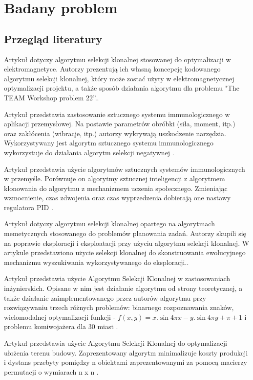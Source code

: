 \documentclass[a4paper]{article}
\begin{document}
\section{Badany problem}
\subsection{Przegląd literatury}
Artykuł dotyczy algorytmu selekcji klonalnej stosowanej do optymalizacji w elektromagnetyce. Autorzy prezentują ich własną koncepcję kodowanego algorytmu selekcji klonalnej, który może zostać użyty w elektromagnetycznej optymalizacji projektu, a także sposób działania algorytmu dla problemu "The TEAM Workshop problem 22”.\cite{1430953}.

Artykuł przedstawia zastosowanie sztucznego systemu immunologicznego w aplikacji przemysłowej. Na postawie parametrów obróbki (siła, moment, itp.) oraz zakłócenia (wibracje, itp.) autorzy wykrywają uszkodzenie narzędzia. Wykorzystywany jest algorytm sztucznego systemu immunologicznego wykorzystuje do działania algorytm selekcji negatywnej \cite{dasgupta1999artificial}.

Artykuł przedstawia użycie algorytmów sztucznych systemów immunologicznych w przemyśle. Porównuje on algorytmy sztucznej inteligencji z algorytmem klonowania do algorytmu z mechanizmem uczenia społecznego. Zmieniając wzmocnienie, czas zdwojenia oraz czas wyprzedzenia dobierają one nastawy regulatora PID \cite{wang_artificial_2017}.

Artykuł dotyczy algorytmu selekcji klonalnej opartego na algorytmach memetycznych stosowanego do problemów planowania zadań. Autorzy skupili się na poprawie eksploracji i eksploatacji przy użyciu algorytmu selekcji klonalnej. W artykule przedstawiono użycie selekcji klonalnej do skonstruowania ewolucyjnego mechanizmu wyszukiwania wykorzystywanego do eksploracji.\cite{yang2008clonal}.

Artykuł przedstawia użycie Algorytmu Selekcji Klonalnej w zastosowaniach inżynierskich. Opisane w nim jest działanie algorytmu od strony teoretycznej, a także działanie zaimplementowanego przez autorów algorytmu przy rozwiązywaniu trzech różnych problemów: binarnego rozpoznawania znaków, wielomodalnej optymalizacji funkcji -
$f(x, y) = x.\sin{4 \pi x} - y.\sin{4 \pi y + \pi} + 1$
i problemu komiwojażera dla 30 miast \cite{de_castro}.


Artykuł przedstawia użycie Algorytmu Selekcji Klonalnej do optymalizacji ułożenia terenu budowy. Zaprezentowany algorytm minimalizuje koszty produkcji i dystans przebyty pomiędzy n obiektami zaprezentowanymi za pomocą macierzy permutacji o wymiarach n x n \cite{WANG2016267}.
\end{document}
